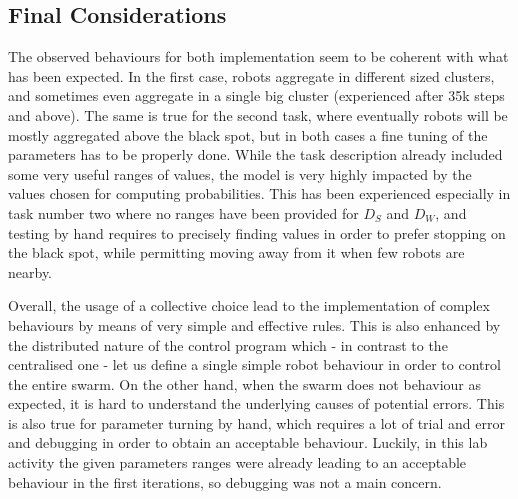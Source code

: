 \subsection{Final Considerations}
The observed behaviours for both implementation seem to be coherent with what
has been expected. In the first case, robots aggregate in different sized
clusters, and sometimes even aggregate in a single big cluster (experienced
after 35k steps and above). The same is true for the second task, where
eventually robots will be mostly aggregated above the black spot, but in both
cases a fine tuning of the parameters has to be properly done. While the task
description already included some very useful ranges of values, the model is
very highly impacted by the values chosen for computing probabilities. This has
been experienced especially in task number two where no ranges have been
provided for $D_S$ and $D_W$, and testing by hand requires to precisely finding
values in order to prefer stopping on the black spot, while permitting moving
away from it when few robots are nearby.

Overall, the usage of a collective choice lead to the implementation of complex
behaviours by means of very simple and effective rules. This is also enhanced
by the distributed nature of the control program which - in contrast to the
centralised one - let us define a single simple robot behaviour in order to
control the entire swarm. On the other hand, when the swarm does not behaviour
as expected, it is hard to understand the underlying causes of potential
errors. This is also true for parameter turning by hand, which requires a lot
of trial and error and debugging in order to obtain an acceptable behaviour.
Luckily, in this lab activity the given parameters ranges were already leading
to an acceptable behaviour in the first iterations, so debugging was not a main
concern.
